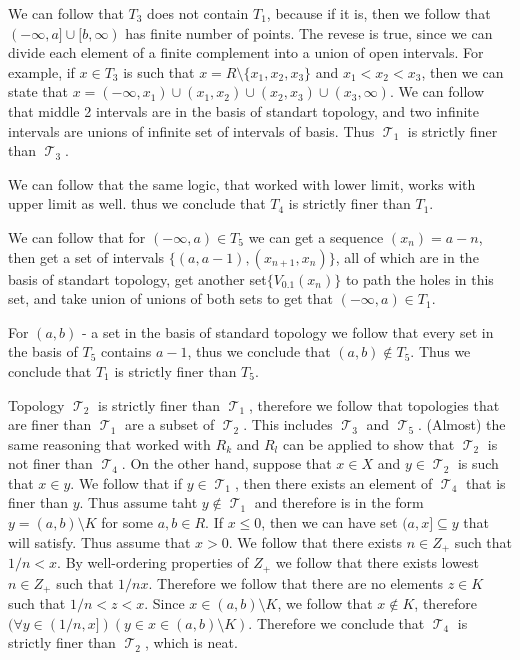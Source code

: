 \documentclass[11pt,oneside,titlepage]{book}
\DeclareMathOperator \topol {\mathcal {T}}
\newcommand{\set}[1]{\{ #1 \}}
\begin{document}
We can follow that $T_3$ does not contain $T_1$, because if it is, then we follow that
$(-\infty, a] \cup [b, \infty)$ has finite number of points. The revese is true, since
we can divide each element of a finite complement into a union of
open intervals. For example, if $x \in T_3$ is such that $x = R \setminus \set{x_1, x_2, x_3}$
and $x_1 < x_2 < x_3$,
then we can state that $x = (-\infty, x_1) \cup (x_1, x_2) \cup (x_2, x_3) \cup (x_3, \infty)$.
We can follow that middle 2 intervals are in the basis of standart topology, and two infinite
intervals are unions of infinite set of intervals of basis.
Thus $\topol_1$ is strictly finer than $\topol_3$.

We can follow that the same logic, that worked with lower limit, works with upper limit as well.
thus we conclude that $T_4$ is strictly finer than $T_1$.

We can follow that for $(-\infty, a) \in T_5$ we can get a sequence $(x_n) = a - n$, then
get a set of intervals $\set{(a, a - 1), (x_{n + 1}, x_n)}$, all of which are in the basis of
standart topology, get another set$\set{V_{0.1}(x_n)}$ to path the holes in this set,
and take union of unions of both sets to get that $(-\infty, a) \in T_1$.

For $(a, b)$ - a set in the basis of standard topology we follow that every set in the
basis of $T_5$ contains $a - 1$, thus we conclude that $(a, b) \notin T_5$. Thus we
conclude that $T_1$ is strictly finer than $T_5$.

Topology $\topol_2$ is strictly finer than $\topol_1$, therefore we follow that
topologies that are finer than $\topol_1$ are a subset of $\topol_2$. This includes
$\topol_3$ and $\topol_5$. (Almost) the same reasoning that worked with $R_k$ and $R_l$
can be applied to show that $\topol_2$ is not finer than $\topol_4$. On the other hand,
suppose that $x \in X$ and $y \in \topol_2$ is such that $x \in y$. We follow that
if $y \in \topol_1$, then there exists an element of $\topol_4$ that is finer than
$y$. Thus assume taht $y \notin \topol_1$ and therefore is in the form
$y = (a, b) \setminus K$ for some $a, b \in R$. If $x \leq 0$, then we can have
set $(a, x] \subseteq y$ that will satisfy. Thus assume that $x > 0$. We follow that there
exists $n \in Z_+$ such that $1/n < x$. By well-ordering properties of $Z_+$ we
follow that there exists lowest $n \in Z_+$ such that $1/n  x$. Therefore we follow that
there are no elements $z \in K$ such that $1/n < z < x$. Since $x \in (a, b) \setminus K$,
we follow that $x \notin K$, therefore
$(\forall y \in (1/n, x])(y \in x \in (a, b) \setminus K)$. Therefore we conclude that
$\topol_4$ is strictly finer than $\topol_2$, which is neat.
\end{document}
